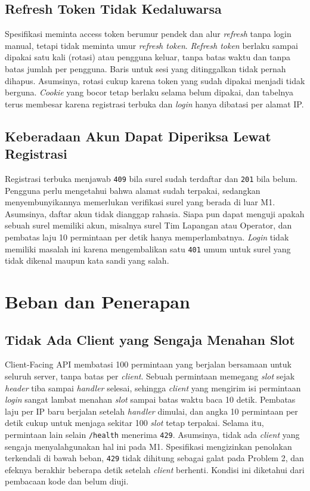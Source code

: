 \subsection{Refresh Token Tidak Kedaluwarsa}

Spesifikasi meminta access token berumur pendek dan alur \textit{refresh} tanpa login manual, tetapi tidak meminta umur \textit{refresh token}. \textit{Refresh token} berlaku sampai dipakai satu kali (rotasi) atau pengguna keluar, tanpa batas waktu dan tanpa batas jumlah per pengguna. Baris untuk sesi yang ditinggalkan tidak pernah dihapus. Asumsinya, rotasi cukup karena token yang sudah dipakai menjadi tidak berguna. \textit{Cookie} yang bocor tetap berlaku selama belum dipakai, dan tabelnya terus membesar karena registrasi terbuka dan \textit{login} hanya dibatasi per alamat IP.

\subsection{Keberadaan Akun Dapat Diperiksa Lewat Registrasi}

Registrasi terbuka menjawab \texttt{409} bila surel sudah terdaftar dan \texttt{201} bila belum. Pengguna perlu mengetahui bahwa alamat sudah terpakai, sedangkan menyembunyikannya memerlukan verifikasi surel yang berada di luar M1. Asumsinya, daftar akun tidak dianggap rahasia. Siapa pun dapat menguji apakah sebuah surel memiliki akun, misalnya surel Tim Lapangan atau Operator, dan pembatas laju 10 permintaan per detik hanya memperlambatnya. \textit{Login} tidak memiliki masalah ini karena mengembalikan satu \texttt{401} umum untuk surel yang tidak dikenal maupun kata sandi yang salah.

\section{Beban dan Penerapan}

\subsection{Tidak Ada Client yang Sengaja Menahan Slot}

Client-Facing API membatasi 100 permintaan yang berjalan bersamaan untuk seluruh server, tanpa batas per \textit{client}. Sebuah permintaan memegang \textit{slot} sejak \textit{header} tiba sampai \textit{handler} selesai, sehingga \textit{client} yang mengirim isi permintaan \textit{login} sangat lambat menahan \textit{slot} sampai batas waktu baca 10 detik. Pembatas laju per IP baru berjalan setelah \textit{handler} dimulai, dan angka 10 permintaan per detik cukup untuk menjaga sekitar 100 \textit{slot} tetap terpakai. Selama itu, permintaan lain selain \texttt{/health} menerima \texttt{429}. Asumsinya, tidak ada \textit{client} yang sengaja menyalahgunakan hal ini pada M1. Spesifikasi mengizinkan penolakan terkendali di bawah beban, \texttt{429} tidak dihitung sebagai galat pada Problem 2, dan efeknya berakhir beberapa detik setelah \textit{client} berhenti. Kondisi ini diketahui dari pembacaan kode dan belum diuji.

